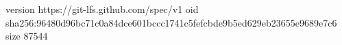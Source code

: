version https://git-lfs.github.com/spec/v1
oid sha256:96480d96bc71c0a84dce601bccc1741c5fefcbde9b5ed629eb23655e9689e7c6
size 87544
